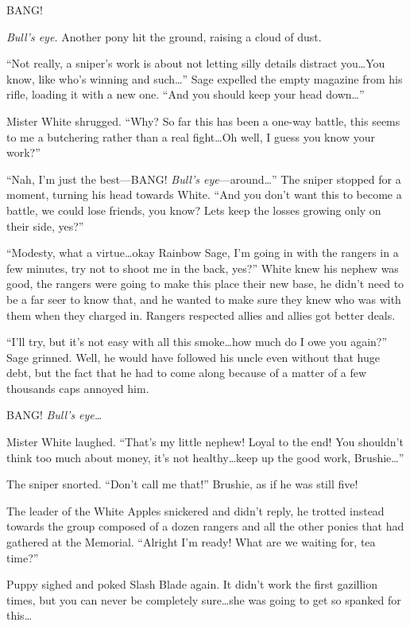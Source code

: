 BANG!

\emph{Bull's eye.} Another pony hit the ground, raising a cloud of dust.

``Not really, a sniper's work is about not letting silly details distract you\dots You know, like who's winning and such\dots'' Sage expelled the empty magazine from his rifle, loading it with a new one. ``And you should keep your head down\dots''

Mister White shrugged. ``Why? So far this has been a one-way battle, this seems to me a butchering rather than a real fight\dots Oh well, I guess you know your work?''

``Nah, I'm just the best---BANG! \emph{Bull's eye}---around\dots'' The sniper stopped for a moment, turning his head towards White. ``And you don't want this to become a battle, we could lose friends, you know? Lets keep the losses growing only on their side, yes?''

``Modesty, what a virtue\dots okay Rainbow Sage, I'm going in with the rangers in a few minutes, try not to shoot me in the back, yes?'' White knew his nephew was good, the rangers were going to make this place their new base, he didn't need to be a far seer to know that, and he wanted to make sure they knew who was with them when they charged in. Rangers respected allies and allies got better deals.

``I'll try, but it's not easy with all this smoke\dots how much do I owe you again?'' Sage grinned. Well, he would have followed his uncle even without that huge debt, but the fact that he had to come along because of a matter of a few thousands caps annoyed him.

BANG! \emph{Bull's eye\dots}

Mister White laughed. ``That's my little nephew! Loyal to the end! You shouldn't think too much about money, it's not healthy\dots keep up the good work, Brushie\dots''

The sniper snorted. ``Don't call me that!'' Brushie, as if he was still five!

The leader of the White Apples snickered and didn't reply, he trotted instead towards the group composed of a dozen rangers and all the other ponies that had gathered at the Memorial. ``Alright I'm ready! What are we waiting for, tea time?''

\horizonline


Puppy sighed and poked Slash Blade again. It didn't work the first gazillion times, but you can never be completely sure\dots she was going to get so spanked for this\dots

